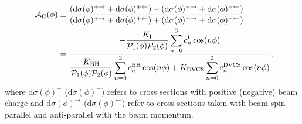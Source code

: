 \begin{align}
\hspace{0.5cm}\mathcal{A}_{\textrm{C}}(\phi) &\equiv  
\frac{(\textrm{d}\sigma(\phi)^{+\rightarrow} +
\textrm{d}\sigma(\phi)^{+\leftarrow}) -
(\textrm{d}\sigma(\phi)^{-\rightarrow}
+ \textrm{d}\sigma(\phi)^{-\leftarrow})}{(\textrm{d}\sigma(\phi)^{+\rightarrow}
+
\textrm{d}\sigma(\phi)^{+\leftarrow}) +
(\textrm{d}\sigma(\phi)^{-\rightarrow}
+ \textrm{d}\sigma(\phi)^{-\leftarrow})}&    \nonumber \\
&=\dfrac{{-\dfrac{K_{\textrm{I}}}{\mathcal{P}_{1}(\phi)\mathcal{P}_{2}(\phi)}
\displaystyle\sum_{n=0}^3
c_{n}^{\textrm{I}}\cos(n\phi)}}{\dfrac{K_{\textrm{BH}}}{\mathcal{P}_{1}
(\phi)\mathcal{P}_
{2}(\phi)}
\displaystyle\sum_{n=0}^2
c_{n}^{\textrm{BH}}\cos(n\phi) + 
K_{\textrm{DVCS}}\displaystyle\sum_{n=0}^2 c_{n}^{\textrm{DVCS}}\cos(n\phi)} ,&
\label{e:ac}
\end{align}
where $\textrm{d}\sigma(\phi)^+$ ($\textrm{d}\sigma(\phi)^-$) refers to
cross sections with positive (negative) beam charge and
$\textrm{d}\sigma(\phi)^\rightarrow$ ($\textrm{d}\sigma(\phi)^\leftarrow$) refer
to cross sections taken with beam spin parallel and anti-parallel with the
beam momentum.
